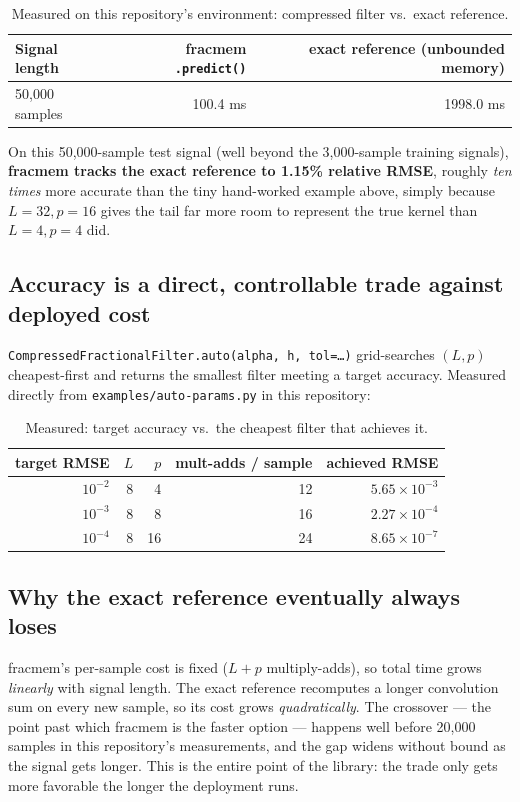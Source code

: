 \documentclass[11pt]{article}
\begin{document}
\begin{table}[h]
\centering
\caption{Measured on this repository's environment: compressed filter vs.\ exact reference.}
\begin{tabular}{lrr}
\toprule
Signal length & fracmem \texttt{.predict()} & exact reference (unbounded memory) \\
\midrule
50,000 samples & 100.4 ms & 1998.0 ms \\
\bottomrule
\end{tabular}
\end{table}

On this 50,000-sample test signal (well beyond the 3,000-sample training signals), \textbf{fracmem tracks the exact reference to 1.15\% relative RMSE}, roughly \emph{ten times} more accurate than the tiny hand-worked example above, simply because $L{=}32,p{=}16$ gives the tail far more room to represent the true kernel than $L{=}4,p{=}4$ did.

\subsection{Accuracy is a direct, controllable trade against deployed cost}
\texttt{CompressedFractionalFilter.auto(alpha, h, tol=\dots)} grid-searches $(L,p)$ cheapest-first and returns the smallest filter meeting a target accuracy. Measured directly from \texttt{examples/auto-params.py} in this repository:

\begin{table}[h]
\centering
\caption{Measured: target accuracy vs.\ the cheapest filter that achieves it.}
\begin{tabular}{rrrrr}
\toprule
target RMSE & $L$ & $p$ & mult-adds / sample & achieved RMSE \\
\midrule
$10^{-2}$ & 8 & 4  & 12 & $5.65\times10^{-3}$ \\
$10^{-3}$ & 8 & 8  & 16 & $2.27\times10^{-4}$ \\
$10^{-4}$ & 8 & 16 & 24 & $8.65\times10^{-7}$ \\
\bottomrule
\end{tabular}
\end{table}

\subsection{Why the exact reference eventually always loses}
fracmem's per-sample cost is fixed ($L{+}p$ multiply-adds), so total time grows \emph{linearly} with signal length. The exact reference recomputes a longer convolution sum on every new sample, so its cost grows \emph{quadratically}. The crossover --- the point past which fracmem is the faster option --- happens well before 20,000 samples in this repository's measurements, and the gap widens without bound as the signal gets longer. This is the entire point of the library: the trade only gets more favorable the longer the deployment runs.
\end{document}

